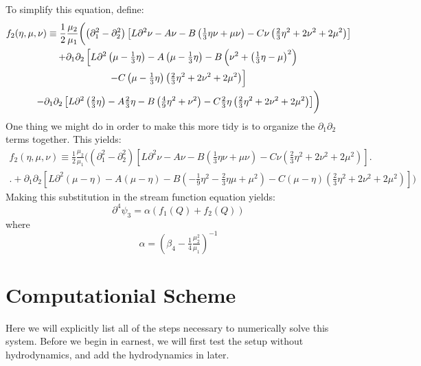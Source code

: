 \documentclass[reqno]{article}
\begin{document}
	To simplify this equation, define:
	\begin{multline} \label{eq:f2-1}
		f_2(\eta, \mu, \nu) \equiv \frac12 \frac{\mu_2}{\mu_1} \biggl( \left( \partial_1^2 - \partial_2^2\right)\left[ L\partial^2 \nu - A\nu - B\left(\tfrac{1}{3}\eta\nu + \mu\nu\right) - C\nu\left( \tfrac{2}{3}\eta^2 + 2\nu^2 + 2\mu^2 \right) \right]\biggr. \\
		+ \partial_1\partial_2 \left[ L\partial^2 \left( \mu - \tfrac{1}{3}\eta \right) - A\left( \mu - \tfrac{1}{3}\eta \right) - B\left( \nu^2 + 
		\left( \tfrac{1}{3}\eta - \mu \right)^2 \right)\right. \\
		\Bigl.- C\left( \mu - \tfrac{1}{3}\eta \right)\left( \tfrac{2}{3}\eta^2 + 2\nu^2 + 2\mu^2 \right) \Bigr] \\
		\biggl.- \partial_1\partial_2 \left[L\partial^2 \left( \tfrac{2}{3}\eta \right) - A \tfrac{2}{3}\eta - B\left( \tfrac{4}{9}\eta^2 + \nu^2 \right) - C \tfrac{2}{3}\eta \left( \tfrac{2}{3}\eta^2 + 2\nu^2 + 2\mu^2 \right) \right] \biggr)
	\end{multline}
	One thing we might do in order to make this more tidy is to organize the $\partial_1\partial_2$ terms together. This yields:
	\begin{multline}\label{eq:f2}
		f_2(\eta, \mu, \nu) \equiv \frac12 \frac{\mu_2}{\mu_1} \biggl( \left( \partial_1^2 - \partial_2^2\right)\left[ L\partial^2 \nu - A\nu - B\left(\tfrac{1}{3}\eta\nu + \mu\nu\right) - C\nu\left( \tfrac{2}{3}\eta^2 + 2\nu^2 + 2\mu^2 \right) \right]\biggr. \\
		\biggl. + \partial_1\partial_2 \left[ L\partial^2 \left( \mu - \eta \right) - A\left( \mu - \eta \right) - B\left( -\tfrac19 \eta^2 - \tfrac23 \eta\mu + \mu^2 \right) - C\left( \mu - \eta\right) \left( \tfrac23 \eta^2 + 2\nu^2 + 2\mu^2 \right)\right] \biggr) 
	\end{multline}
	Making this substitution in the stream function equation yields:
	\begin{equation} \label{eq:streamfuncsimp}
		\partial^4 \psi_3 
		= \alpha \left( f_1(Q) + f_2(Q) \right)
	\end{equation}
	where
	\begin{equation}
		\alpha 
		= \left( \beta_4 - \tfrac14 \tfrac{\mu_2^2}{\mu_1} \right)^{-1}
	\end{equation}
	
	\section{Computationial Scheme}
	Here we will explicitly list all of the steps necessary to numerically solve this system. Before we begin in earnest, we will first test the setup without hydrodynamics, and add the hydrodynamics in later. 
	
\end{document}
